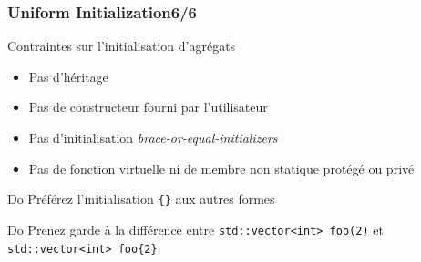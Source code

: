 \documentclass[C++.tex]{subfiles}
\begin{document}
\begin{frame}[fragile]
	\frametitle{Uniform Initialization\titlehfill{}6/6}
	\begin{alertblock}{Contraintes sur l'initialisation d'agrégats}
		\begin{itemize}
			\item Pas d'héritage
			\item Pas de constructeur fourni par l'utilisateur
			\item Pas d'initialisation \textit{brace-or-equal-initializers}
			\item Pas de fonction virtuelle ni de membre non statique protégé ou privé
		\end{itemize}

	\end{alertblock}

	\begin{exampleblock}{Do}
		Préférez l'initialisation \lstinline|{}| aux autres formes

	\end{exampleblock}

	\begin{exampleblock}{Do}
		Prenez garde à la différence entre \lstinline|std::vector<int> foo(2)| et \lstinline|std::vector<int> foo{2}|
	\end{exampleblock}
\end{frame}
\end{document}
